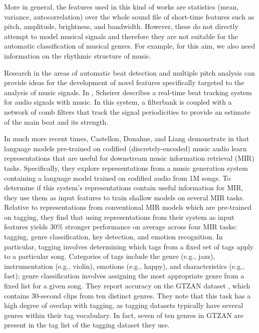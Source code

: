 \documentclass[english, LaM, oneside, noexaminfo]{sapthesis}
\begin{document}
More in general, the features used in this kind of works are statistics (mean, variance, autocorrelation) over the whole sound file of short-time features such as pitch, amplitude, brightness, and bandwidth.
However, these do not directly attempt to model musical signals and therefore they are not suitable for the automatic classification of musical genres. For example, for this aim, we also need information on the rhythmic structure of music.

Research in the areas of automatic beat detection and multiple pitch analysis can provide ideas for the development of novel features specifically targeted to the analysis of music signals. In \cite{scheirer1998tempo}, Scheirer describes a real-time beat tracking system for audio signals with music. In this system, a filterbank is coupled with a network of comb filters that track the signal periodicities to provide an estimate of the main beat and its strength.

In much more recent times, Castellon, Donahue, and Liang demonstrate in \cite{castellon2021codified} that language models pre-trained on codified (discretely-encoded) music audio learn representations that are useful for downstream music information retrieval (MIR) tasks. Specifically, they explore representations from a music generation system containing a language model trained on codified audio from 1M songs. To determine if this system’s representations contain useful information for MIR, they use them as input features to train shallow models on several MIR tasks. Relative to representations from conventional MIR models which are pre-trained on tagging, they find that using representations from their system as input features yields $30\%$ stronger performance on average across four MIR tasks: tagging, genre classification, key detection, and emotion recognition. In particular, tagging involves determining which tags from a fixed set of tags apply to a particular song. Categories of tags include the genre (e.g., jazz), instrumentation (e.g., violin), emotions (e.g., happy), and characteristics (e.g., fast); genre classification involves assigning the most appropriate genre from a fixed list for a given song. They report accuracy on the GTZAN dataset \cite{tzanetakis2002musical}, which contains 30-second clips from ten distinct genres. They note that this task has a high degree of overlap with tagging, as tagging datasets typically have several genres within their tag vocabulary. In fact, seven of ten genres in GTZAN are present in the tag list of the tagging dataset they use.
\end{document}
